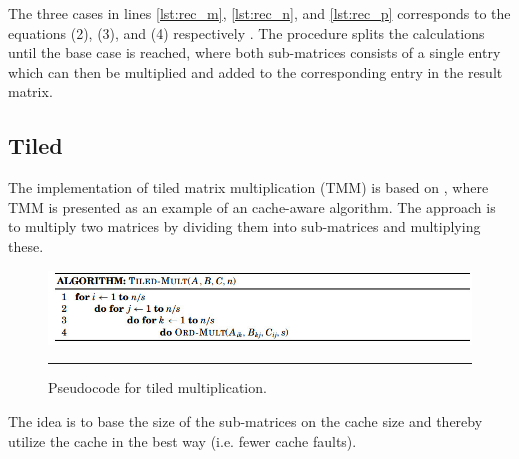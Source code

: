 The three cases in lines \ref{lst:rec_m}, \ref{lst:rec_n}, and \ref{lst:rec_p} corresponds to the equations (2), (3), and (4) respectively \citep{matrixMultiplication}.
The procedure splits the calculations until the base case is reached, where both sub-matrices consists of a single entry which can then be multiplied and added to the corresponding entry in the result matrix.



\subsection{Tiled}
The implementation of tiled matrix multiplication (TMM) is based on \citep{matrixMultiplication}, where TMM is presented as an example of an cache-aware algorithm. 
The approach is to multiply two matrices by dividing them into sub-matrices and multiplying these. 
\begin{figure}[htbp]
	\centering
		\includegraphics[width=\textwidth]{./Figures/Project2a/TiledMulti_Pseudo.jpg}
		\rule{35em}{0.5pt}
	\caption[Pseudocode for tiled multiplication]{
	Pseudocode for tiled multiplication.
	}
	\label{fig:TiledMulti_Pseudo}
\end{figure}
The idea is to base the size of the sub-matrices on the cache size and thereby utilize the cache in the best way (i.e. fewer cache faults).   

